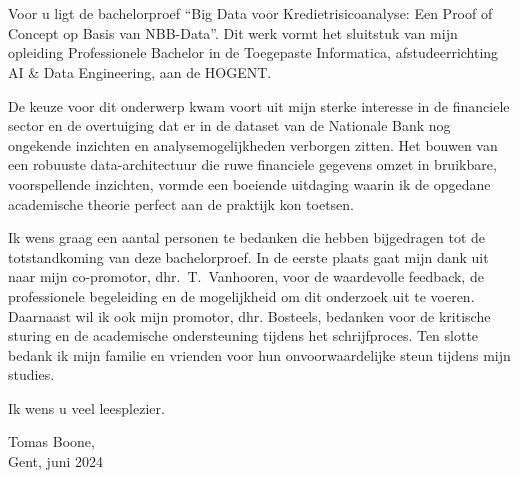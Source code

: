 
\chapter*{}%
\label{ch:voorwoord}

Voor u ligt de bachelorproef ``Big Data voor Kredietrisicoanalyse: Een Proof of Concept op Basis van NBB-Data''. Dit werk vormt het sluitstuk van mijn opleiding Professionele Bachelor in de Toegepaste Informatica, afstudeerrichting AI \& Data Engineering, aan de HOGENT.

De keuze voor dit onderwerp kwam voort uit mijn sterke interesse in de financiele sector en de overtuiging dat er in de dataset van de Nationale Bank nog ongekende inzichten en analysemogelijkheden verborgen zitten. Het bouwen van een robuuste data-architectuur die ruwe financiele gegevens omzet in bruikbare, voorspellende inzichten, vormde een boeiende uitdaging waarin ik de opgedane academische theorie perfect aan de praktijk kon toetsen.

Ik wens graag een aantal personen te bedanken die hebben bijgedragen tot de totstandkoming van deze bachelorproef. In de eerste plaats gaat mijn dank uit naar mijn co-promotor, dhr.\ T.\ Vanhooren, voor de waardevolle feedback, de professionele begeleiding en de mogelijkheid om dit onderzoek uit te voeren. Daarnaast wil ik ook mijn promotor, dhr. Bosteels, bedanken voor de kritische sturing en de academische ondersteuning tijdens het schrijfproces. Ten slotte bedank ik mijn familie en vrienden voor hun onvoorwaardelijke steun tijdens mijn studies.

Ik wens u veel leesplezier.


Tomas Boone,\\



Gent, juni 2024